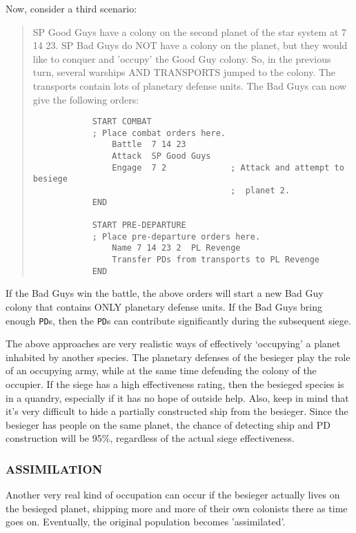 \documentclass[10pt,titlepage]{article}
\begin{document}
Now, consider a third scenario:
\begin{quotation}
	SP Good Guys have a colony on the second planet of the star system
	at 7 14 23.  SP Bad Guys do NOT have a colony on the planet, but
	they would like to conquer and 'occupy' the Good Guy colony.  So,
	in the previous turn, several warships AND TRANSPORTS jumped to the
	colony.  The transports contain lots of planetary defense units.
	The Bad Guys can now give the following orders:
\begin{verbatim}
            START COMBAT
            ; Place combat orders here.
                Battle  7 14 23
                Attack  SP Good Guys
                Engage  7 2             ; Attack and attempt to besiege
                                        ;  planet 2.
            END

            START PRE-DEPARTURE
            ; Place pre-departure orders here.
                Name 7 14 23 2  PL Revenge
                Transfer PDs from transports to PL Revenge
            END
\end{verbatim}
\end{quotation}

If the Bad Guys win the battle, the above orders will start a new Bad Guy
colony that contains ONLY planetary defense units.  If the Bad Guys bring
enough \texttt{PD}s, then the \texttt{PD}s can contribute significantly during the subsequent
siege.

The above approaches are very realistic ways of effectively `occupying' a
planet inhabited by another species.  The planetary defenses of the besieger
play the role of an occupying army, while at the same time defending the colony
of the occupier.  If the siege has a high effectiveness rating, then the
besieged species is in a quandry, especially if it has no hope of outside help.
Also, keep in mind that it's very difficult to hide a partially constructed
ship from the besieger.  Since the besieger has people on the same planet, the
chance of detecting ship and PD construction will be 95\%, regardless of the
actual siege effectiveness.


\subsubsection{ASSIMILATION}
\label{sec:assimilation}


Another very real kind of occupation can occur if the besieger actually lives
on the besieged planet, shipping more and more of their own colonists there as
time goes on.  Eventually, the original population becomes 'assimilated'.
\end{document}
